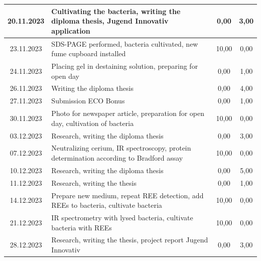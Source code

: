 \begin{longtable}{|c|p{7cm}|c|c|}
    20.11.2023    & Cultivating the bacteria, writing the diploma thesis, Jugend Innovativ application & 0,00 & 3,00 \\ \hline
    23.11.2023    & SDS-PAGE performed, bacteria cultivated, new fume cupboard installed                                            & 10,00 & 0,00 \\ \hline
    24.11.2023    & Placing gel in destaining solution, preparing for open day                                                      & 0,00                 & 1,00              \\ \hline
    26.11.2023    & Writing the diploma thesis                                                                                      & 0,00                 & 4,00              \\ \hline
    27.11.2023    & Submission ECO Bonus                                                                                            & 0,00                 & 1,00              \\ \hline
    30.11.2023    & Photo for newspaper article, preparation for open day, cultivation of bacteria & 10,00 & 0,00 \\ \hline
    03.12.2023    & Research, writing the diploma thesis                                                                            & 0,00                 & 3,00              \\ \hline
    07.12.2023    & Neutralizing cerium, IR spectroscopy, protein determination according to Bradford assay & 10,00 & 0,00 \\ \hline
    10.12.2023    & Research, writing the diploma thesis                                                                            & 0,00                 & 5,00              \\ \hline
    11.12.2023    & Research, writing the thesis                                                                                    & 0,00                 & 1,00              \\ \hline
    14.12.2023    & Prepare new medium, repeat REE detection, add REEs to bacteria, cultivate bacteria & 10,00 & 0,00 \\ \hline
    21.12.2023    & IR spectrometry with lysed bacteria, cultivate bacteria with REEs                                               & 10,00 & 0,00 \\ \hline
    28.12.2023    & Research, writing the thesis, project report Jugend Innovativ                                                   & 0,00                 & 3,00              \\ \hline

\end{longtable}
